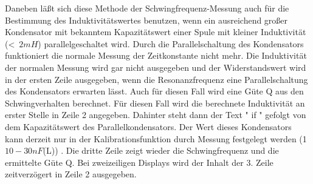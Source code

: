 Daneben läßt sich diese Methode der Schwingfrequenz-Messung auch für die Bestimmung des Induktivitätswertes benutzen,
wenn ein ausreichend großer Kondensator mit bekanntem Kapazitätswert einer Spule mit kleiner Induktivität (\textless~\(2mH\))
parallelgeschaltet wird. Durch die Parallelschaltung des Kondensators funktioniert die normale Messung der
Zeitkonstante nicht mehr. Die Induktivität der normalen Messung wird gar nicht ausgegeben und der
Widerstandswert wird in der ersten Zeile ausgegeben, wenn die Resonanzfrequenz eine Parallelschaltung
des Kondensators erwarten lässt. Auch für diesen Fall wird eine Güte Q aus den Schwingverhalten berechnet.
Für diesen Fall wird die berechnete Induktivität an erster Stelle in Zeile 2 angegeben. Dahinter steht dann
der Text " if " gefolgt von dem Kapazitätswert des Parallelkondensators. Der Wert dieses Kondensators kann derzeit
nur in der Kalibrationsfunktion durch Messung festgelegt werden (\mbox{1  \(10-30nF\)(L)}) .
Die dritte Zeile zeigt wieder die Schwingfrequenz und die ermittelte Güte Q. 
Bei zweizeiligen Displays wird der Inhalt der 3. Zeile zeitverzögert in Zeile 2 ausgegeben.

